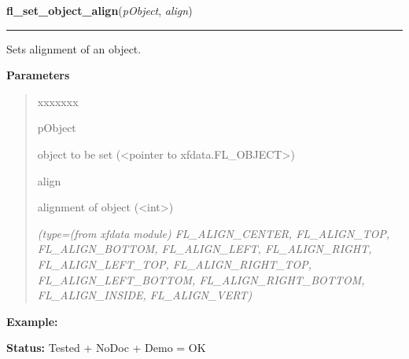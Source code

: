 \hspace{.8\funcindent}\begin{boxedminipage}{\funcwidth}

    \raggedright \textbf{fl\_set\_object\_align}(\textit{pObject}, \textit{align})

    \vspace{-1.5ex}

    \rule{\textwidth}{0.5\fboxrule}
\setlength{\parskip}{2ex}
    Sets alignment of an object.

\setlength{\parskip}{1ex}
      \textbf{Parameters}
      \vspace{-1ex}

      \begin{quote}
        \begin{Ventry}{xxxxxxx}

          \item[pObject]

          object to be set ({\textless}pointer to 
          xfdata.FL\_OBJECT{\textgreater})

          \item[align]

          alignment of object ({\textless}int{\textgreater})

            {\it (type=(from xfdata module) FL\_ALIGN\_CENTER, FL\_ALIGN\_TOP, FL\_ALIGN\_BOTTOM, 
FL\_ALIGN\_LEFT, FL\_ALIGN\_RIGHT, FL\_ALIGN\_LEFT\_TOP, 
FL\_ALIGN\_RIGHT\_TOP, FL\_ALIGN\_LEFT\_BOTTOM, FL\_ALIGN\_RIGHT\_BOTTOM, 
FL\_ALIGN\_INSIDE, FL\_ALIGN\_VERT)}

        \end{Ventry}

      \end{quote}

\textbf{Example:} 

\textbf{Status:} Tested + NoDoc + Demo = OK



    \end{boxedminipage}

    \label{xformslib:library:fl_set_object_shortcut}

    \vspace{0.5ex}

